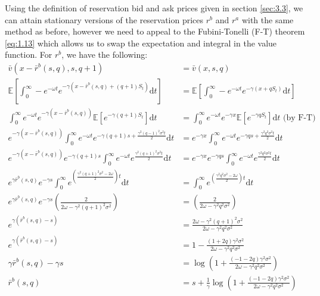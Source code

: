 Using the definition of reservation bid and ask prices given in section \ref{sec:3.3}, 
we can attain stationary versions of the reservation prices $r^b$ and $r^a$ with the 
same method as before, however we need to appeal to the Fubini-Tonelli (F-T) theorem 
\eqref{eq:1.13} which allows us to swap the expectation and integral in the value function. 
For $r^b$, we have the following:
\begin{align*}
    \bar{v}(x-\bar{r}^b(s,q),s,q+1)&=\bar{v}(x,s,q)\\
    \mathbb{E}\left[\int_{0}^{\infty}-e^{-\omega t}e^{-\gamma(x-\bar{r}^b(s,q)+(q+1)S_t)}\mathrm dt\right]&=\mathbb{E}\left[\int_{0}^{\infty}-e^{-\omega t}e^{-\gamma(x+qS_t)}\mathrm dt\right]\\
    \int_{0}^{\infty}e^{-\omega t}e^{-\gamma(x-\bar{r}^b(s,q))}\mathbb{E}\left[e^{-\gamma(q+1)S_t}\right]\mathrm dt&=\int_{0}^{\infty}e^{-\omega t}e^{-\gamma x}\mathbb{E}\left[e^{-\gamma qS_t}\right]\mathrm dt\textrm{ (by F-T)}\\
    e^{-\gamma(x-\bar{r}^b(s,q))}\int_{0}^{\infty}e^{-\omega t}e^{-\gamma(q+1)s+\frac{\gamma^2(q-1)^2\sigma^2t}{2}}\mathrm dt&=e^{-\gamma x}\int_{0}^{\infty}e^{-\omega t}e^{-\gamma qs+\frac{\gamma^2q^2\sigma^2t}{2}}\mathrm dt\\
    e^{-\gamma(x-\bar{r}^b(s,q))}e^{-\gamma(q+1)s}\int_{0}^{\infty}e^{-\omega t}e^{\frac{\gamma^2(q+1)^2\sigma^2t}{2}}\mathrm dt&=e^{-\gamma x}e^{-\gamma qs}\int_{0}^{\infty}e^{-\omega t}e^{\frac{\gamma^2q^2\sigma^2t}{2}}\mathrm dt\\
    e^{\gamma \bar{r}^b(s,q)}e^{-\gamma s}\int_{0}^{\infty}e^{\left(\frac{\gamma^2(q+1)^2\sigma^2-2\omega}{2}\right)t}\mathrm dt&=\int_{0}^{\infty}e^{\left(\frac{\gamma^2q^2\sigma^2-2\omega}{2}\right)t}\mathrm dt\\
    e^{\gamma \bar{r}^b(s,q)}e^{-\gamma s}\left(\frac{2}{2\omega-\gamma^2(q+1)^2\sigma^2}\right)&=\left(\frac{2}{2\omega-\gamma^2q^2\sigma^2}\right)\\
    e^{\gamma(\bar{r}^b(s,q)-s)}&=\frac{2\omega-\gamma^2(q+1)^2\sigma^2}{2\omega-\gamma^2q^2\sigma^2}\\
    e^{\gamma(\bar{r}^b(s,q)-s)}&=1-\frac{(1+2q)\gamma^2\sigma^2}{2\omega-\gamma^2q^2\sigma^2}\\
    \gamma\bar{r}^b(s,q)-\gamma s&=\log\left(1+\frac{(-1-2q)\gamma^2\sigma^2}{2\omega-\gamma^2q^2\sigma^2}\right)\\
    \bar{r}^b(s,q) &= s+\frac{1}{\gamma}\log\left(1+\frac{(-1-2q)\gamma^2\sigma^2}{2\omega-\gamma^2q^2\sigma^2}\right)
\end{align*}
